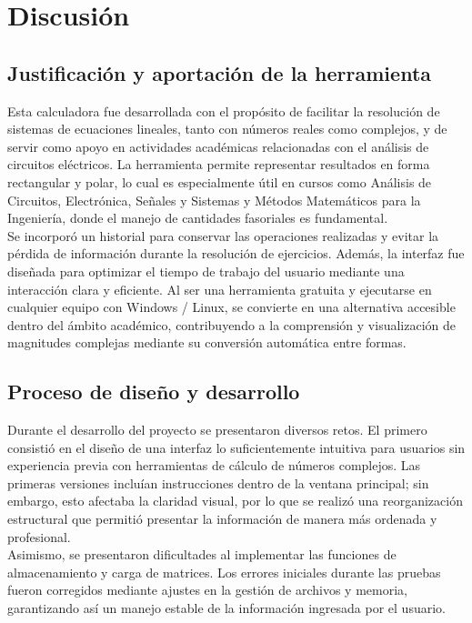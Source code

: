 \documentclass[12pt,a4paper]{article}
\begin{document}
\section{Discusión}

\subsection{Justificación y aportación de la herramienta}

Esta calculadora fue desarrollada con el propósito de facilitar la resolución de sistemas de ecuaciones lineales, tanto con números reales como complejos, y de servir como apoyo en actividades académicas relacionadas con el análisis de circuitos eléctricos. La herramienta permite representar resultados en forma rectangular y polar, lo cual es especialmente útil en cursos como Análisis de Circuitos, Electrónica, Señales y Sistemas y Métodos Matemáticos para la Ingeniería, donde el manejo de cantidades fasoriales es fundamental. \\

Se incorporó un historial para conservar las operaciones realizadas y evitar la pérdida de información durante la resolución de ejercicios. Además, la interfaz fue diseñada para optimizar el tiempo de trabajo del usuario mediante una interacción clara y eficiente. Al ser una herramienta gratuita y ejecutarse en cualquier equipo con Windows / Linux, se convierte en una alternativa accesible dentro del ámbito académico, contribuyendo a la comprensión y visualización de magnitudes complejas mediante su conversión automática entre formas. 

\subsection{Proceso de diseño y desarrollo}

Durante el desarrollo del proyecto se presentaron diversos retos. El primero consistió en el diseño de una interfaz lo suficientemente intuitiva para usuarios sin experiencia previa con herramientas de cálculo de números complejos. Las primeras versiones incluían instrucciones dentro de la ventana principal; sin embargo, esto afectaba la claridad visual, por lo que se realizó una reorganización estructural que permitió presentar la información de manera más ordenada y profesional. \\

Asimismo, se presentaron dificultades al implementar las funciones de almacenamiento y carga de matrices. Los errores iniciales durante las pruebas fueron corregidos mediante ajustes en la gestión de archivos y memoria, garantizando así un manejo estable de la información ingresada por el usuario. \\
\end{document}
